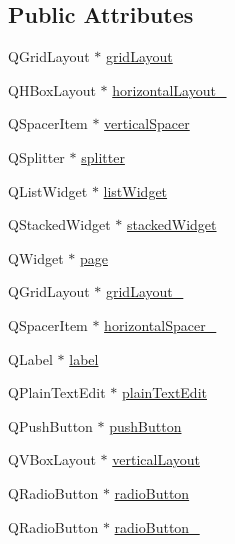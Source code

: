 \subsection*{Public Attributes}
\begin{DoxyCompactItemize}
\item 
Q\+Grid\+Layout $\ast$ \hyperlink{classUi__MattySettingsDialog_a12c748325b36f553442171a4b8708c26}{grid\+Layout}
\item 
Q\+H\+Box\+Layout $\ast$ \hyperlink{classUi__MattySettingsDialog_a1375b6bf1c6f67822688dbcffc8348a9}{horizontal\+Layout\+\_}
\item 
Q\+Spacer\+Item $\ast$ \hyperlink{classUi__MattySettingsDialog_a544c6542dc6561947512cfa9c6428cb4}{vertical\+Spacer}
\item 
Q\+Splitter $\ast$ \hyperlink{classUi__MattySettingsDialog_ac1f89fadbbf9a2a2c6a1b29b793966b6}{splitter}
\item 
Q\+List\+Widget $\ast$ \hyperlink{classUi__MattySettingsDialog_a092ef7dfa48ae9c8aad4606690c1e6db}{list\+Widget}
\item 
Q\+Stacked\+Widget $\ast$ \hyperlink{classUi__MattySettingsDialog_a8a2a4dbb6feae0c8d691241a8ab6ec5f}{stacked\+Widget}
\item 
Q\+Widget $\ast$ \hyperlink{classUi__MattySettingsDialog_a3ce6395ee3087c88bf0421568d3f2073}{page}
\item 
Q\+Grid\+Layout $\ast$ \hyperlink{classUi__MattySettingsDialog_aedb2292c10e9456af605ac6d693e032b}{grid\+Layout\+\_}
\item 
Q\+Spacer\+Item $\ast$ \hyperlink{classUi__MattySettingsDialog_a78704372a8ff324a1c60b57507468c81}{horizontal\+Spacer\+\_}
\item 
Q\+Label $\ast$ \hyperlink{classUi__MattySettingsDialog_a3e47a3a5cf6ede47f1c43c9b97d65f95}{label}
\item 
Q\+Plain\+Text\+Edit $\ast$ \hyperlink{classUi__MattySettingsDialog_af7fb1de089a082c312ab417fe3f850dc}{plain\+Text\+Edit}
\item 
Q\+Push\+Button $\ast$ \hyperlink{classUi__MattySettingsDialog_a9dc0075ea8668c036f7208db116b8361}{push\+Button}
\item 
Q\+V\+Box\+Layout $\ast$ \hyperlink{classUi__MattySettingsDialog_a48dce493aef2a264d0ad37d412414184}{vertical\+Layout}
\item 
Q\+Radio\+Button $\ast$ \hyperlink{classUi__MattySettingsDialog_a5e7e8269079472402cd9050c969df6c1}{radio\+Button}
\item 
Q\+Radio\+Button $\ast$ \hyperlink{classUi__MattySettingsDialog_aff88fbe355ba7e5946674126a6a2c326}{radio\+Button\+\_}

\end{DoxyCompactItemize}
